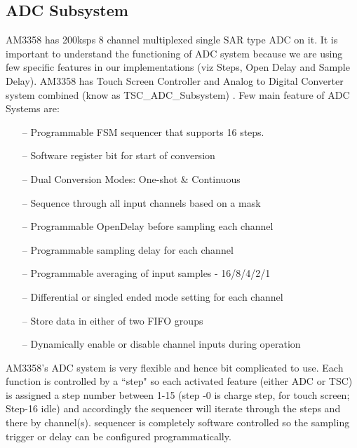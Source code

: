 \subsection{ADC Subsystem}
AM3358 has 200ksps 8 channel multiplexed single SAR type ADC on it. It is important to understand the functioning of ADC system because we are using few specific features in our implementations (viz Steps, Open Delay and Sample Delay). AM3358 has Touch Screen Controller and Analog to Digital Converter system combined (know as TSC\_ADC\_Subsystem) \cite{AM3358TRM} . Few main feature of ADC Systems are: 
\begin{itemize}
	\item[--] Programmable FSM sequencer that supports 16 steps.
	\item[--] Software register bit for start of conversion
	\item[--] Dual Conversion Modes: One-shot \& Continuous
	\item[--] Sequence through all input channels based on a mask
	\item[--] Programmable OpenDelay before sampling each channel
	\item[--] Programmable sampling delay for each channel
	\item[--] Programmable averaging of input samples - 16/8/4/2/1
	\item[--] Differential or singled ended mode setting for each channel
	\item[--] Store data in either of two FIFO groups
	\item[--] Dynamically enable or disable channel inputs during operation
\end{itemize}
AM3358's ADC system is very flexible and hence bit complicated to use. Each function is controlled by a ``step" so each activated feature (either ADC or TSC) is assigned a step number between 1-15 (step -0 is charge step, for touch screen; Step-16 idle) and accordingly the sequencer will iterate through the steps and there by channel(s). sequencer is completely software controlled so the sampling trigger or delay can be configured programmatically.
